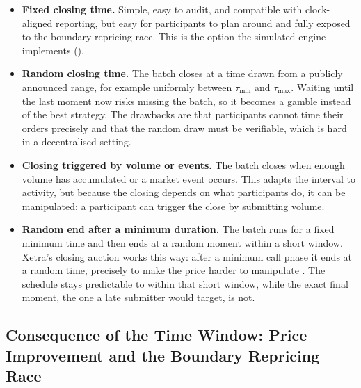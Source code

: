 \begin{itemize}
  \item \textbf{Fixed closing time.} Simple, easy to audit, and compatible with
  clock-aligned reporting, but easy for participants to plan around and fully
  exposed to the boundary repricing race. This is the option the simulated
  engine implements ().
  \item \textbf{Random closing time.} The batch closes at a time drawn from a
  publicly announced range, for example uniformly between $\tau_{\min}$ and
  $\tau_{\max}$. Waiting until the last moment now risks missing the batch,
  so it becomes a gamble instead of the best strategy. The drawbacks are that
  participants cannot time their orders precisely and that the random draw
  must be verifiable, which is hard in a decentralised setting.
  \item \textbf{Closing triggered by volume or events.} The batch closes when
  enough volume has accumulated or a market event occurs. This adapts the
  interval to activity, but because the closing depends on what participants
  do, it can be manipulated: a participant can trigger the close by
  submitting volume.
  \item \textbf{Random end after a minimum duration.} The batch runs for a
  fixed minimum time and then ends at a random moment within a short
  window. Xetra's closing auction works this way: after a minimum call
  phase it ends at a random time, precisely to make the price harder to
  manipulate \citep{deutscheboerse2026xetra}. The schedule stays predictable
  to within that short window, while the exact final moment, the one a
  late submitter would target, is not.
\end{itemize}

\subsection{Consequence of the Time Window: Price Improvement and the
Boundary Repricing Race}
\label{sec:priceimprovement}

